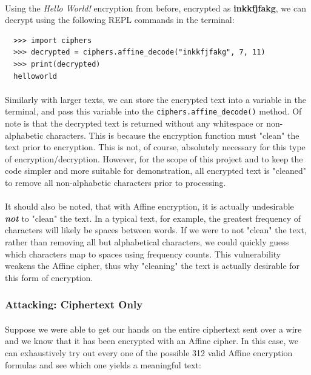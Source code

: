 \documentclass[12pt,a4paper]{article}
\begin{document}
\paragraph{}
Using the \textit{Hello World!} encryption from before, encrypted as
\textbf{inkkfjfakg}, we can decrypt using the following REPL commands in the 
terminal:

\begin{verbatim}
  >>> import ciphers
  >>> decrypted = ciphers.affine_decode("inkkfjfakg", 7, 11)
  >>> print(decrypted)
  helloworld
\end{verbatim}

\paragraph{}
Similarly with larger texts, we can store the encrypted text into a variable 
in the terminal, and pass this variable into the \verb|ciphers.affine_decode()| 
method.  Of note is that the decrypted text is returned without any whitespace 
or non-alphabetic characters.  This is because the encryption function must 
"clean" the text prior to encryption.  This is not, of course, absolutely 
necessary for this type of encryption/decryption.  However, for the scope of 
this project and to keep the code simpler and more suitable for demonstration, 
all encrypted text is "cleaned" to remove all non-alphabetic characters prior 
to processing.

\paragraph{}
It should also be noted, that with Affine encryption, it is actually undesirable 
\textbf{\textit{not}} to "clean" the text.  In a typical text, for example, the 
greatest frequency of characters will likely be spaces between words.  If we 
were to not "clean" the text, rather than removing all but alphabetical characters, 
we could quickly guess which characters map to spaces using frequency counts.  
This vulnerability weakens the Affine cipher, thus why "cleaning" the text is 
actually desirable for this form of encryption.

\subsubsection{Attacking:  Ciphertext Only}
\paragraph{}
Suppose we were able to get our hands on the entire ciphertext sent over a wire 
and we know that it has been encrypted with an Affine cipher.  In this case, we 
can exhaustively try out every one of the possible 312 valid Affine encryption 
formulas and see which one yields a meaningful text:
\end{document}
